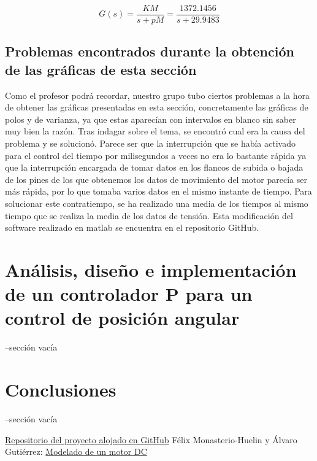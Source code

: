 \documentclass[a4paper]{article}
\begin{document}
\begin{equation}
G(s) = \frac{KM}{s+pM} = \frac{1372.1456}{s+29.9483}
\end{equation}


\subsection{Problemas encontrados durante la obtención de las gráficas de esta sección}
Como el profesor podrá recordar, nuestro grupo tubo ciertos problemas a la hora de obtener las gráficas presentadas en esta sección, concretamente las gráficas de polos y de varianza,
ya que estas aparecían con intervalos en blanco sin saber muy bien la razón. Tras indagar sobre el tema, se encontró cual era la causa
del problema y se solucionó. Parece ser que la interrupción que se había activado para el control del tiempo por milisegundos a veces
no era lo bastante rápida ya que la interrupción encargada de tomar datos en los flancos de subida o bajada de los pines de los que obtenemos
los datos de movimiento del motor parecía ser más rápida, por lo que tomaba varios datos en el mismo instante de tiempo. Para solucionar este
contratiempo, se ha realizado una media de los tiempos al mismo tiempo que se realiza la media de los datos de tensión. Esta modificación del
software realizado en matlab se encuentra en el repositorio GitHub.


\section{Análisis, diseño e implementación de un controlador P para un control de posición angular}

--sección vacía

\section{Conclusiones}

--sección vacía



\begin{thebibliography}{99}
 \href{https://github.com/jjalberca/reallabo2018}{Repositorio del proyecto alojado en GitHub}
 Félix Monasterio-Huelin y Álvaro Gutiérrez: \href{http://robolabo.etsit.upm.es/asignaturas/seco/apuntes/modelado.pdf}{Modelado de un motor DC}
\end{thebibliography}
\end{document}
